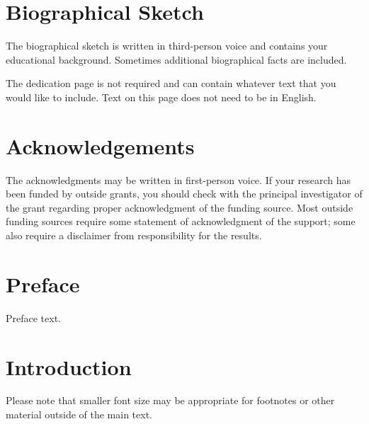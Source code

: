 \documentclass[letterpaper, 12pt, extrafontsizes, oneside]{memoir}
\begin{document}
\pagestyle{plain}
\restorepagenumber

\chapter{Biographical Sketch}
The biographical sketch is written in third-person voice and contains your educational background.
Sometimes additional biographical facts are included.
\clearpage

\begin{vplace}
  \begin{center}
    The dedication page is not required and can contain whatever text that you would like to include.
    Text on this page does not need to be in English.
  \end{center}
\end{vplace}
\clearpage

\chapter{Acknowledgements}
The acknowledgments may be written in first-person voice.
If your research has been funded by outside grants, you should check with the principal investigator of the grant regarding proper acknowledgment of the funding source.
Most outside funding sources require some statement of acknowledgment of the support; some also require a disclaimer from responsibility for the results.
\cleardoublepage

\renewcommand*{\contentsname}{Table of Contents}
\tableofcontents
\clearpage

\listoffigures
\clearpage

\listoftables
\cleardoublepage

\chapter{Preface}
Preface text.
\cleardoublepage

\mainmatter

\chapter{Introduction}
Please note that smaller font size may be appropriate for footnotes or other material outside of the main text.
\end{document}
